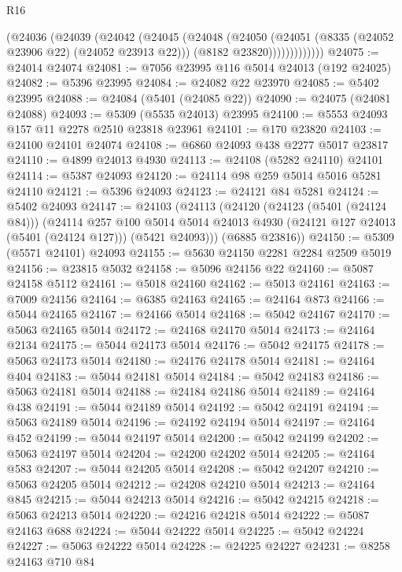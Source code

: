 \begin{lexlean}{R16}
\begin{coremodule}
                (@24036
                  (@24039
                    (@24042
                      (@24045
                        (@24048
                          (@24050
                            (@24051 (@8335 (@24052 @23906 @22) (@24052 @23913 @22)))
                            (@8182 @23820)))))))))))))
@24075 := @24014 @24074
@24081 := @7056 @23995 @116 @5014 @24013 (@192 @24025)
@24082 := @5396 @23995
@24084 := @24082 @22 @23970
@24085 := @5402 @23995
@24088 := @24084 (@5401 (@24085 @22))
@24090 := @24075 (@24081 @24088)
@24093 := @5309 (@5535 @24013) @23995
@24100 := @5553 @24093 @157 @11 @2278 @2510 @23818 @23961
@24101 := @170 @23820
@24103 := @24100 @24101 @24074
@24108 := @6860 @24093 @438 @2277 @5017 @23817
@24110 := @4899 @24013 @4930
@24113 := @24108 (@5282 @24110) @24101
@24114 := @5387 @24093
@24120 := @24114 @98 @259 @5014 @5016 @5281 @24110
@24121 := @5396 @24093
@24123 := @24121 @84 @5281
@24124 := @5402 @24093
@24147 := @24103
    (@24113
      (@24120
        (@24123 (@5401 (@24124 @84)))
        (@24114
          @257
          @100
          @5014
          @5014
          @24013
          @4930
          (@24121 @127 @24013 (@5401 (@24124 @127)))
          (@5421 @24093)))
      (@6885 @23816))
@24150 := @5309 (@5571 @24101) @24093
@24155 := @5630 @24150 @2281 @2284 @2509 @5019
@24156 := @23815 @5032
@24158 := @5096 @24156 @22
@24160 := @5087 @24158 @5112
@24161 := @5018 @24160
@24162 := @5013 @24161
@24163 := @7009 @24156
@24164 := @6385 @24163
@24165 := @24164 @873
@24166 := @5044 @24165
@24167 := @24166 @5014
@24168 := @5042 @24167
@24170 := @5063 @24165 @5014
@24172 := @24168 @24170 @5014
@24173 := @24164 @2134
@24175 := @5044 @24173 @5014
@24176 := @5042 @24175
@24178 := @5063 @24173 @5014
@24180 := @24176 @24178 @5014
@24181 := @24164 @404
@24183 := @5044 @24181 @5014
@24184 := @5042 @24183
@24186 := @5063 @24181 @5014
@24188 := @24184 @24186 @5014
@24189 := @24164 @438
@24191 := @5044 @24189 @5014
@24192 := @5042 @24191
@24194 := @5063 @24189 @5014
@24196 := @24192 @24194 @5014
@24197 := @24164 @452
@24199 := @5044 @24197 @5014
@24200 := @5042 @24199
@24202 := @5063 @24197 @5014
@24204 := @24200 @24202 @5014
@24205 := @24164 @583
@24207 := @5044 @24205 @5014
@24208 := @5042 @24207
@24210 := @5063 @24205 @5014
@24212 := @24208 @24210 @5014
@24213 := @24164 @845
@24215 := @5044 @24213 @5014
@24216 := @5042 @24215
@24218 := @5063 @24213 @5014
@24220 := @24216 @24218 @5014
@24222 := @5087 @24163 @688
@24224 := @5044 @24222 @5014
@24225 := @5042 @24224
@24227 := @5063 @24222 @5014
@24228 := @24225 @24227
@24231 := @8258 @24163 @710 @84

\end{coremodule}
\end{lexlean}
